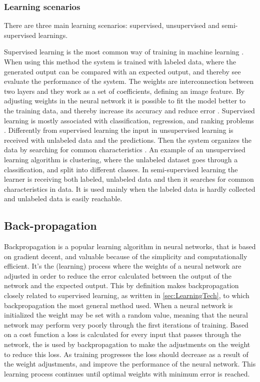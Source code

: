 \subsubsection{Learning scenarios}
There are three main learning scenarios: supervised, unsupervised and semi-supervised learnings.

Supervised learning is the most common way of training in machine learning \citep{LeCun2015}. When using this method the system is trained with labeled data, where the generated output can be compared with an expected output, and thereby see evaluate the performance of the system. The weights are interconnection between two layers and they work as a set of coefficients, defining an image feature.\citep{Hameed2016} By adjusting weights in the neural network it is possible to fit the model better to the training data, and thereby increase its accuracy and reduce error \citep{LeCun2015}. Supervised learning is mostly associated with classification, regression, and ranking problems \citep{Mehryar2012}.
\noindent
Differently from supervised learning the input in unsupervised learning is received with unlabeled data and the predictions. Then the system organizes the data by searching for common characteristics \citep{Mehryar2012}. An example of an unsupervised learning algorithm is clustering, where the unlabeled dataset goes through a classification, and split into different classes.\citep{Goodfellow2016} 
\noindent
In semi-supervised learning the learner is receiving both labeled, unlabeled data and then it searches for common characteristics in data. It is used mainly when the labeled data is hardly collected and unlabeled data is easily reachable.\citep{Mehryar2012}



  
\subsection{Back-propagation}


Backpropagation is a popular learning algorithm in neural networks, that is based on gradient decent, and valuable because of the simplicity and computationally efficient. \citep{Bengio2012, Duda2000}
It's the (learning) process where the weights of a neural network are adjusted in order to reduce the error calculated between the output of the network and the expected output. This by definition makes backpropagation closely related to supervised learning, as written in \ref{sec:LearningTech}, to which backpropagation the most general method used.\citep{Duda2000}  
When a neural network is initialized the weight may be set with a random value, meaning that the neural network may perform very poorly through the first iterations of training. Based on a cost function a loss is calculated for every input that passes through the network, the is used by backpropagation to make the adjustments on the weight to reduce this loss. As training progresses the loss should decrease as a result of the weight adjustments, and improve the performance of the neural network. \citep{Duda2000, Goodfellow2016}   
This learning process continues until optimal weights with minimum error is reached.\citep{Hameed2016}



